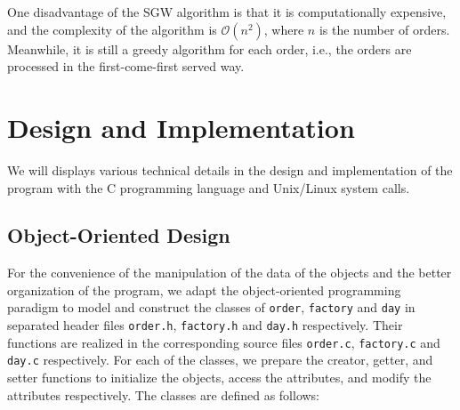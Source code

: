 \documentclass[a4paper, 12pt]{article}
\begin{document}
One disadvantage of the SGW algorithm is that it is computationally expensive, and the complexity of the algorithm is $\mathcal{O}(n^2)$, where $n$ is the number of orders.
Meanwhile, it is still a greedy algorithm for each order, i.e., the orders are processed in the first-come-first served way.

\section{Design and Implementation}

We will displays various technical details in the design and implementation of the program with the C programming language and Unix/Linux system calls.

\subsection{Object-Oriented Design}

For the convenience of the manipulation of the data of the objects and the better organization of the program, we adapt the object-oriented programming paradigm
to model and construct the classes of \texttt{order}, \texttt{factory} and \texttt{day} in separated header files \texttt{order.h}, \texttt{factory.h} and \texttt{day.h} respectively.
Their functions are realized in the corresponding source files \texttt{order.c}, \texttt{factory.c} and \texttt{day.c} respectively. For each of the classes, we prepare
the creator, getter, and setter functions to initialize the objects, access the attributes, and modify the attributes respectively. The classes are defined as follows:
\end{document}
